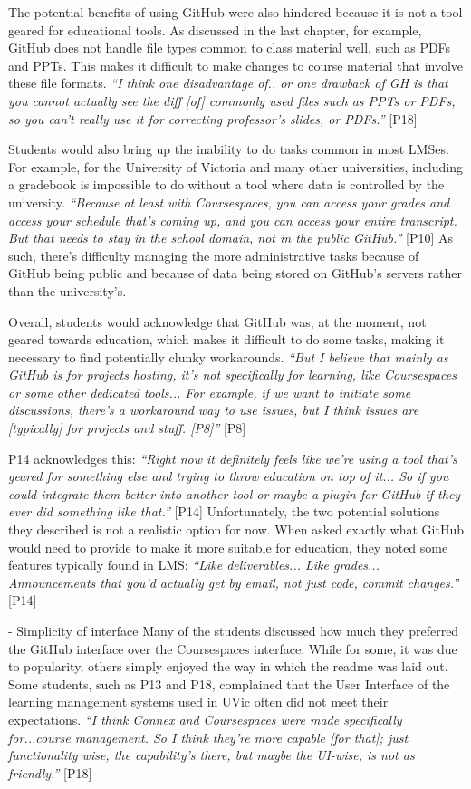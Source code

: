 The potential benefits of using GitHub were also hindered because it is not a tool geared for educational tools. As discussed in the last chapter, for example, GitHub does not handle file types common to class material well, such as PDFs and PPTs. This makes it difficult to make changes to course material that involve these file formats. \textit{``I think one disadvantage of.. or one drawback of GH is that you cannot actually see the diff [of] commonly used files such as PPTs or PDFs, so you can't really use it for correcting professor's slides, or PDFs.''} [P18]

Students would also bring up the inability to do tasks common in most LMSes. For example, for the University of Victoria and many other universities, including a gradebook is impossible to do without a tool where data is controlled by the university. \textit{``Because at least with Coursespaces, you can access your grades and access your schedule that's coming up, and you can access your entire transcript. But that needs to stay in the school domain, not in the public GitHub.''} [P10] As such, there's difficulty managing the more administrative tasks because of GitHub being public and because of data being stored on GitHub's servers rather than the university's.

Overall, students would acknowledge that GitHub was, at the moment, not geared towards education, which makes it difficult to do some tasks, making it necessary to find potentially clunky workarounds. \textit{``But I believe that mainly as GitHub is for projects hosting, it's not specifically for learning, like Coursespaces or some other dedicated tools... For example, if we want to initiate some discussions, there's a workaround way to use issues, but I think issues are [typically] for projects and stuff. [P8]''} [P8]

P14 acknowledges this: \textit{``Right now it definitely feels like we're using a tool that's geared for something else and trying to throw education on top of it... So if you could integrate them better into another tool or maybe a plugin for GitHub if they ever did something like that.''} [P14] Unfortunately, the two potential solutions they described is not a realistic option for now. When asked exactly what GitHub would need to provide to make it more suitable for education, they noted some features typically found in LMS: \textit{``Like deliverables... Like grades... Announcements that you'd actually get by email, not just code, commit changes.''} [P14]

- Simplicity of interface
Many of the students discussed how much they preferred the GitHub interface over the Coursespaces interface. While for some, it was due to popularity, others simply enjoyed the way in which the readme was laid out. Some students, such as P13 and P18, complained that the User Interface of the learning management systems used in UVic often did not meet their expectations. \textit{``I think Connex and Coursespaces were made specifically for...course management. So I think they're more capable [for that]; just functionality wise, the capability's there, but maybe the UI-wise, is not as friendly.''} [P18]

